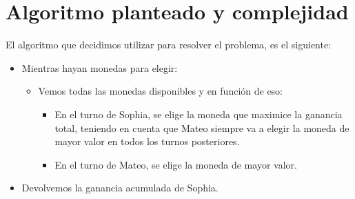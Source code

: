 \section{Algoritmo planteado y complejidad}

El algoritmo que decidimos utilizar para resolver el problema, es el siguiente:

\begin {itemize}
\item Mientras hayan monedas para elegir:
    \begin {itemize}
    \item Vemos todas las monedas disponibles y en función de eso:
        \begin {itemize}
        \item En el turno de Sophia, se elige la moneda que maximice la ganancia total, teniendo en cuenta que Mateo siempre va a elegir la moneda de mayor valor en todos los turnos posteriores.
        \item En el turno de Mateo, se elige la moneda de mayor valor.
        \end {itemize}
    \end {itemize}
\item Devolvemos la ganancia acumulada de Sophia.
\end {itemize}

